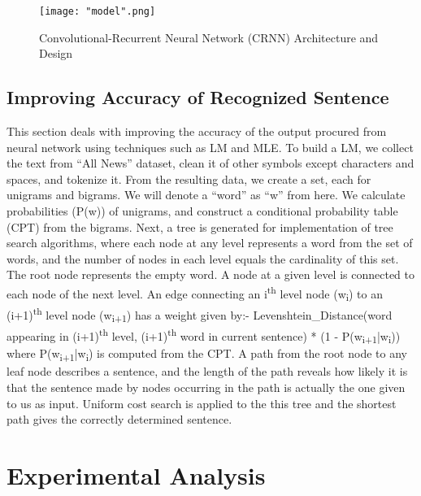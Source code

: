 \documentclass[a4paper, 10pt,twocolumn]{article}
\begin{document}
\begin{figure}[h]
\centering
\texttt{[image: "model".png]}
\caption{Convolutional-Recurrent Neural Network (CRNN) Architecture and Design}
\end{figure}

\subsection*{Improving Accuracy of Recognized Sentence}

This section deals with improving the accuracy of the output procured from neural network using techniques such as LM and MLE. To build a LM, we collect the text from \enquote{All News} dataset, clean it of other symbols except characters and spaces, and tokenize it. From the resulting data, we create a set, each for unigrams and bigrams. We will denote a \enquote{word} as \enquote{w} from here. We calculate probabilities (P(w)) of unigrams, and construct a conditional probability table (CPT) from the bigrams. Next, a tree is generated for implementation of tree search algorithms, where each node at any level represents a word from the set of words, and the number of nodes in each level equals the cardinality of this set. The root node represents the empty word. A node at a given level is connected to each node of the next level. An edge connecting an i\textsuperscript{th} level node (w\textsubscript{i}) to an (i+1)\textsuperscript{th} level node (w\textsubscript{i+1}) has a weight given by:- \newline \newline Levenshtein\_Distance(word appearing in (i+1)\textsuperscript{th} level, (i+1)\textsuperscript{th} word in current sentence) * (1 - P(w\textsubscript{i+1}|w\textsubscript{i})) \newline \newline where P(w\textsubscript{i+1}|w\textsubscript{i}) is computed from the CPT. A path from the root node to any leaf node describes a sentence, and the length of the path reveals how likely it is that the sentence made by nodes occurring in the path is actually the one given to us as input. Uniform cost search is applied to the this tree and the shortest path gives the correctly determined sentence.

\section{Experimental Analysis}
\end{document}
